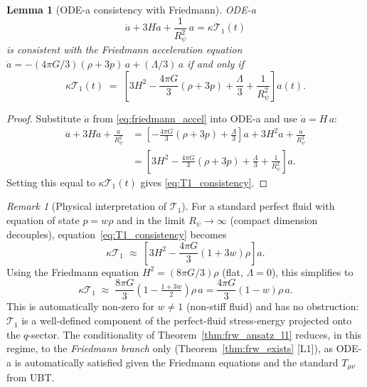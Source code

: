 \documentclass[12pt,a4paper]{article}
\newtheorem{lemma}[theorem]{Lemma}
\theoremstyle{definition}
\theoremstyle{remark}
\newtheorem{remark}[theorem]{Remark}
\begin{document}
\begin{lemma}[ODE-a consistency with Friedmann]
\label{lem:ode_a_friedmann}
ODE-a
\begin{equation*}
  \ddot{a} + 3H\dot{a} + \frac{1}{R_\psi^2}\,a = \kappa\mathcal{T}_1(t)
\end{equation*}
is consistent with the Friedmann acceleration equation
$\ddot{a} = -(4\pi G/3)(\rho+3p)\,a + (\Lambda/3)\,a$
if and only if
\begin{equation}
  \label{eq:T1_consistency}
  \kappa\mathcal{T}_1(t)
  \;=\;
  \left[
    3H^2 - \frac{4\pi G}{3}(\rho+3p) + \frac{\Lambda}{3} + \frac{1}{R_\psi^2}
  \right] a(t).
\end{equation}
\end{lemma}

\begin{proof}
Substitute $\ddot{a}$ from \eqref{eq:friedmann_accel} into ODE-a and use
$\dot{a} = H\,a$:
\begin{align*}
  \ddot{a} + 3H\dot{a} + \frac{a}{R_\psi^2}
  &= \left[-\frac{4\pi G}{3}(\rho+3p) + \frac{\Lambda}{3}\right]a
     + 3H^2 a + \frac{a}{R_\psi^2} \\
  &= \left[3H^2 - \frac{4\pi G}{3}(\rho+3p) + \frac{\Lambda}{3} + \frac{1}{R_\psi^2}\right]a.
\end{align*}
Setting this equal to $\kappa\mathcal{T}_1(t)$ gives \eqref{eq:T1_consistency}.
\end{proof}

\begin{remark}[Physical interpretation of $\mathcal{T}_1$]
\label{rem:T1_interpretation}
For a standard perfect fluid with equation of state $p = w\rho$ and in the
limit $R_\psi\to\infty$ (compact dimension decouples), equation~\eqref{eq:T1_consistency}
becomes
\[
  \kappa\mathcal{T}_1 \;\approx\; \left[3H^2 - \frac{4\pi G}{3}(1+3w)\rho\right]a.
\]
Using the Friedmann equation $H^2 = (8\pi G/3)\rho$ (flat, $\Lambda=0$), this simplifies to
\[
  \kappa\mathcal{T}_1 \;\approx\; \frac{8\pi G}{3}(1 - \tfrac{1+3w}{2})\rho\,a
  = \frac{4\pi G}{3}(1-w)\rho\,a.
\]
This is automatically non-zero for $w\neq 1$ (non-stiff fluid) and has no
obstruction: $\mathcal{T}_1$ is a well-defined component of the perfect-fluid
stress-energy projected onto the $q$-sector.  The conditionality of
Theorem~\ref{thm:frw_ansatz_l1} reduces, in this regime, to the \emph{Friedmann
branch} only (Theorem~\ref{thm:frw_exists} [L1]), as ODE-a is automatically satisfied given the
Friedmann equations and the standard $T_{\mu\nu}$ from UBT.
\end{remark}
\end{document}
